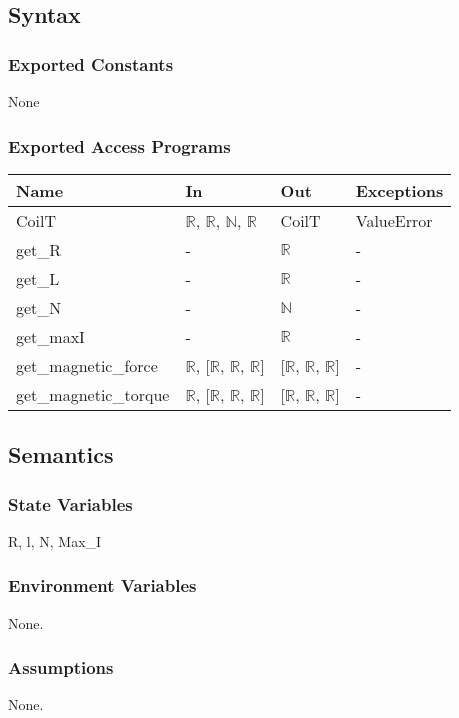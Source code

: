 \documentclass[12pt, titlepage]{article}
\begin{document}
\subsection{Syntax}

\subsubsection{Exported Constants}
None
\subsubsection{Exported Access Programs}

\begin{center}
\begin{tabular}{p{4cm} p{4cm} p{4cm} p{2cm}}
\hline
\textbf{Name} & \textbf{In} & \textbf{Out} & \textbf{Exceptions} \\
\hline
CoilT & $\mathbb{R}$, $\mathbb{R}$, $\mathbb{N}$, $\mathbb{R}$ & CoilT  & ValueError \\
\hline
get\_R & - & $\mathbb{R}$  & -  \\
\hline
get\_L & - & $\mathbb{R}$  & -  \\
\hline
get\_N & - & $\mathbb{N}$  & -  \\
\hline
get\_maxI & - & $\mathbb{R}$  & -  \\
\hline
get\_magnetic\_force & $\mathbb{R}$, [$\mathbb{R}$, $\mathbb{R}$, $\mathbb{R}$] & [$\mathbb{R}$, $\mathbb{R}$, $\mathbb{R}$]  & -  \\
\hline
get\_magnetic\_torque & $\mathbb{R}$, [$\mathbb{R}$, $\mathbb{R}$, $\mathbb{R}$] & [$\mathbb{R}$, $\mathbb{R}$, $\mathbb{R}$]  & -  \\
\hline
\end{tabular}
\end{center}

\subsection{Semantics}

\subsubsection{State Variables}
R, l, N, Max\_I
\subsubsection{Environment Variables}
None.
\subsubsection{Assumptions}
None.
\end{document}
